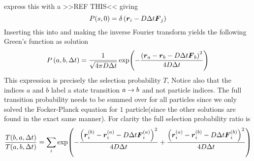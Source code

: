         express this with a >>REF THIS<< giving
            \begin{equation}
                P(s,0) = \delta\left(\boldsymbol{{r}}_i - D\Delta t\boldsymbol{{F}}_j\right)
            \end{equation}
        Inserting this into  and making the inverse Fourier
        transform yields the following Green's function as solution
            \begin{equation}
                P\left(a, b, \Delta t\right) = \frac{1}{\sqrt{4\pi D\Delta t}}
                \exp(-\frac{\left(\boldsymbol{{r}}_a - \boldsymbol{{r}}_b - D\Delta t
                \boldsymbol{{F}}_b\right)^2}{4D\Delta t})
            \end{equation}
        This expression is precisely the selection probability $T$, Notice also
        that the indices $a$ and $b$ label a state transition $a\rightarrow b$ and not
        particle indices. The full transition probability needs to be summed
        over for all particles since we only solved the Focker-Planck equation
        for $1$ particle(since the other solutions are found in the exact same
        manner). For clarity the full selection probability ratio is
            \begin{equation}
                \frac{T(b,a,\Delta t)}{T(a,b,\Delta t)} = \sum_i
                \exp(-\frac{\left(\boldsymbol{{r}}^{(b)}_i - \boldsymbol{{r}}^{(a)}_i - D\Delta
                t \boldsymbol{{F}}^{(a)}_i\right)^2}{4D\Delta t}
                +\frac{\left(\boldsymbol{{r}}^{(a)}_i - \boldsymbol{{r}}^{(b)}_i - D\Delta t
                \boldsymbol{{F}}^{(b)}_i\right)^2}{4D\Delta t})
            \end{equation}

